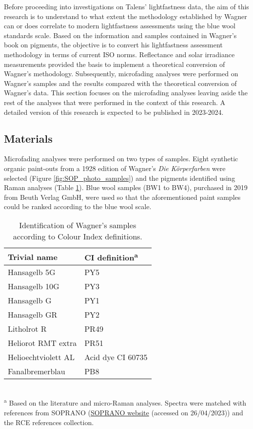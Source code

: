 Before proceeding into investigations on Talens’ lightfastness data, the aim of this research is to understand to what extent the methodology established by Wagner can or does correlate to modern lightfastness assessments using the blue wool standards scale. Based on the information and samples contained in Wagner’s \citeyear{wagner_korperfarben_1928} book on pigments, the objective is to convert his lightfastness assessment methodology in terms of current ISO norms. Reflectance and solar irradiance measurements provided the basis to implement a theoretical conversion of Wagner’s methodology. Subsequently, microfading analyses were performed on Wagner's samples and the results compared with the theoretical conversion of Wagner’s data. This section focuses on the microfading analyses leaving aside the rest of the analyses that were performed in the context of this research. A detailed version of this research is expected to be published in 2023-2024. \\


\subsection{Materials}

Microfading analyses were performed on two types of samples. Eight synthetic organic paint-outs from a 1928 edition of Wagner’s \textit{Die Körperfarben} were selected (Figure \ref{fig:SOP_photo_samples}) and the pigments identified using Raman analyses (Table \ref{tab:Wagner_samples_CI}). Blue wool samples (BW1 to BW4), purchased in 2019 from Beuth Verlag GmbH, were used so that the aforementioned paint samples could be ranked according to the blue wool scale.

\begin{table}[!h]
\centering
\caption[\hspace{0.3cm}Identification of Wagner's samples according to Colour Index definitions]{Identification of Wagner's samples according to Colour Index definitions.}
\begin{tabular}{ll}    
\toprule[0.4mm]
\textbf{Trivial name} & \textbf{CI definition}\textsuperscript{a} \\\midrule
Hansagelb 5G & PY5 \\
Hansagelb 10G & PY3 \\
Hansagelb G & PY1 \\
Hansagelb GR & PY2 \\
Litholrot R & PR49 \\
Heliorot RMT extra & PR51 \\
Helioechtviolett AL & Acid dye CI 60735 \\
Fanalbremerblau & PB8 \\
\bottomrule[0.4mm]
\end{tabular}
\footnotesize{\\ \textsuperscript{a} Based on the literature and micro-Raman analyses. Spectra were matched with references from SOPRANO (\href{https://soprano.kikirpa.be/index.php?lib=sop}{SOPRANO website} (accessed on 26/04/2023))  and the \gls{RCE} references collection.}
\label{tab:Wagner_samples_CI}
\end{table}

